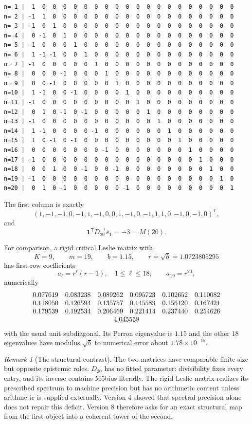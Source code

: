\documentclass[11pt]{amsart}
\numberwithin{equation}{section}
\theoremstyle{plain}
\theoremstyle{definition}
\theoremstyle{remark}
\newtheorem{remark}[theorem]{Remark}
\begin{document}
\begingroup
\scriptsize
\begin{verbatim}
n= 1 |  1  0  0  0  0  0  0  0  0  0  0  0  0  0  0  0  0  0  0  0
n= 2 | -1  1  0  0  0  0  0  0  0  0  0  0  0  0  0  0  0  0  0  0
n= 3 | -1  0  1  0  0  0  0  0  0  0  0  0  0  0  0  0  0  0  0  0
n= 4 |  0 -1  0  1  0  0  0  0  0  0  0  0  0  0  0  0  0  0  0  0
n= 5 | -1  0  0  0  1  0  0  0  0  0  0  0  0  0  0  0  0  0  0  0
n= 6 |  1 -1 -1  0  0  1  0  0  0  0  0  0  0  0  0  0  0  0  0  0
n= 7 | -1  0  0  0  0  0  1  0  0  0  0  0  0  0  0  0  0  0  0  0
n= 8 |  0  0  0 -1  0  0  0  1  0  0  0  0  0  0  0  0  0  0  0  0
n= 9 |  0  0 -1  0  0  0  0  0  1  0  0  0  0  0  0  0  0  0  0  0
n=10 |  1 -1  0  0 -1  0  0  0  0  1  0  0  0  0  0  0  0  0  0  0
n=11 | -1  0  0  0  0  0  0  0  0  0  1  0  0  0  0  0  0  0  0  0
n=12 |  0  1  0 -1  0 -1  0  0  0  0  0  1  0  0  0  0  0  0  0  0
n=13 | -1  0  0  0  0  0  0  0  0  0  0  0  1  0  0  0  0  0  0  0
n=14 |  1 -1  0  0  0  0 -1  0  0  0  0  0  0  1  0  0  0  0  0  0
n=15 |  1  0 -1  0 -1  0  0  0  0  0  0  0  0  0  1  0  0  0  0  0
n=16 |  0  0  0  0  0  0  0 -1  0  0  0  0  0  0  0  1  0  0  0  0
n=17 | -1  0  0  0  0  0  0  0  0  0  0  0  0  0  0  0  1  0  0  0
n=18 |  0  0  1  0  0 -1  0  0 -1  0  0  0  0  0  0  0  0  1  0  0
n=19 | -1  0  0  0  0  0  0  0  0  0  0  0  0  0  0  0  0  0  1  0
n=20 |  0  1  0 -1  0  0  0  0  0 -1  0  0  0  0  0  0  0  0  0  1
\end{verbatim}
\endgroup

The first column is exactly
\[
(1,-1,-1,0,-1,1,-1,0,0,1,-1,0,-1,1,1,0,-1,0,-1,0)^{\mathsf T},
\]
and
\[
\mathbf 1^{\mathsf T}D_{20}^{-1}e_1=-3=M(20).
\]

For comparison, a rigid critical Leslie matrix with
\[
K=9,\qquad m=19,\qquad b=1.15,\qquad r=\sqrt b=1.0723805295
\]
has first-row coefficients
\[
a_\ell=r^\ell(r-1),\quad 1\le\ell\le18,
\qquad
a_{19}=r^{20},
\]
numerically
\[
\begin{array}{rrrrrr}
0.077619&0.083238&0.089262&0.095723&0.102652&0.110082\\
0.118050&0.126594&0.135757&0.145583&0.156120&0.167421\\
0.179539&0.192534&0.206469&0.221414&0.237440&0.254626\\
\multicolumn{6}{c}{4.045558}
\end{array}
\]
with the usual unit subdiagonal.  Its Perron eigenvalue is $1.15$ and the other $18$ eigenvalues
have modulus $\sqrt b$ to numerical error about $1.78\times10^{-15}$.

\begin{remark}[The structural contrast]
\label{rem:D_vs_L_contrast}
The two matrices have comparable finite size but opposite epistemic roles.  $D_{20}$ has no
fitted parameter: divisibility fixes every entry, and its inverse contains M\"obius literally.
The rigid Leslie matrix realizes its prescribed spectrum to machine precision but has no
arithmetic content unless arithmetic is supplied externally.  Version 4 showed that spectral
precision alone does not repair this deficit.  Version 8 therefore asks for an exact structural
map from the first object into a coherent tower of the second.
\end{remark}
\end{document}
